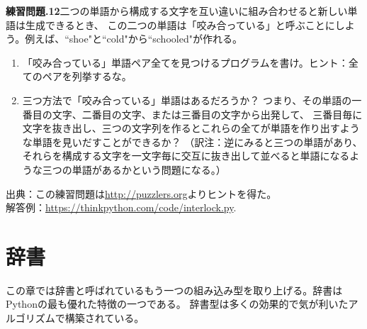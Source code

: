 \documentclass[a4j,12pt,makeidx]{jbook}
\newcommand{\tp}{\thechapter}
\begin{document}
\noindent
{\bf 練習問題\tp.12}二つの単語から構成する文字を互い違いに組み合わせると新しい単語は生成できるとき、
この二つの単語は「咬み合っている」と呼ぶことにしよう。例えば、``shoe"と``cold"から``schooled"が作れる。
\begin{enumerate}
\item 「咬み合っている」単語ペア全てを見つけるプログラムを書け。ヒント：全てのペアを列挙するな。
\item 三つ方法で「咬み合っている」単語はあるだろうか？
つまり、その単語の一番目の文字、二番目の文字、または三番目の文字から出発して、
三番目毎に文字を抜き出し、三つの文字列を作るとこれらの全てが単語を作り出すような単語を見いだすことができるか？
（訳注：逆にみると三つの単語があり、
それらを構成する文字を一文字毎に交互に抜き出して並べると単語になるような三つの単語があるかという問題になる。）
\end{enumerate}
出典：この練習問題は\url{http://puzzlers.org}よりヒントを得た。\\
解答例：\url{https://thinkpython.com/code/interlock.py}.
%
\chapter{辞書}
この章では辞書と呼ばれているもう一つの組み込み型を取り上げる。辞書はPythonの最も優れた特徴の一つである。
辞書型は多くの効果的で気が利いたアルゴリズムで構築されている。
\end{document}
